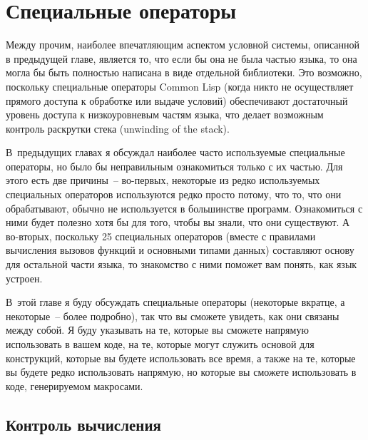 \chapter{Специальные операторы}
\label{ch:20}

\thispagestyle{empty}

Между прочим, наиболее впечатляющим аспектом условной системы, описанной в предыдущей
главе, является то, что если бы она не была частью языка, то она могла бы быть полностью
написана в виде отдельной библиотеки.  Это возможно, поскольку специальные операторы
Common Lisp (когда никто не осуществляет прямого доступа к обработке или выдаче условий)
обеспечивают достаточный уровень доступа к низкоуровневым частям языка, что делает
возможным контроль раскрутки стека (unwinding of the stack).

В~предыдущих главах я обсуждал наиболее часто используемые специальные операторы, но было
бы неправильным ознакомиться только с их частью.  Для этого есть две причины~-- во-первых,
некоторые из редко используемых специальных операторов используются редко просто
потому, что то, что они обрабатывают, обычно не используется в большинстве программ.
Ознакомиться с ними будет полезно хотя бы для того, чтобы вы знали, что они существуют.  А
во-вторых, поскольку 25 специальных операторов (вместе с правилами вычисления вызовов
функций и основными типами данных) составляют основу для остальной части языка, то
знакомство с ними поможет вам понять, как язык устроен.

В~этой главе я буду обсуждать специальные операторы (некоторые вкратце, а некоторые~--
более подробно), так что вы сможете увидеть, как они связаны между собой.  Я буду указывать
на те, которые вы сможете напрямую использовать в вашем коде, на те, которые могут служить
основой для конструкций, которые вы будете использовать все время, а также на те, которые
вы будете редко использовать напрямую, но которые вы сможете использовать в коде,
генерируемом макросами.

\section{Контроль вычисления}

